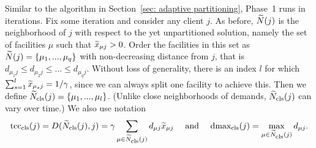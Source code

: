 \documentclass[oneside,final]{ucr}
\begin{document}
Similar to the algorithm in Section~\ref{sec: adaptive partitioning},
Phase~1 runs in iterations. Fix some iteration and consider any client
$j$.  As before, ${\widetilde N}(j)$ is the neighborhood of $j$ with respect
to the yet unpartitioned solution, namely the set of facilities $\mu$
such that ${\widetilde x}_{\mu j}>0$. Order the facilities in this set as
${\widetilde N}(j) = { \left\{ \mu_1,...,\mu_q \right\} }$ with non-decreasing distance
from $j$, that is $d_{\mu_1 j} \leq d_{\mu_2 j} \leq \ldots \leq
d_{\mu_q j}$. Without loss of generality,
there is an index $l$ for which $\sum_{s=1}^l {\widetilde x}_{\mu_s j} =
1/\gamma$, since we can always split one facility to achieve
this. Then we define ${\widetilde N}_{{\mbox{\scriptsize\rm cls}}}(j) = { \left\{ \mu_1,...,\mu_l \right\} }$. 
(Unlike close neighborhoods of demands, ${\widetilde N}_{{\mbox{\scriptsize\rm cls}}}(j)$ can vary over time.)
We also use notation
%
\begin{equation*}
\mbox{\rm{tcc}}_{{\mbox{\scriptsize\rm cls}}}(j) =  D({\widetilde N}_{{\mbox{\scriptsize\rm cls}}}(j), j) = \gamma\sum_{\mu\in{\widetilde N}_{{\mbox{\scriptsize\rm cls}}}(j)} d_{\mu j} {\widetilde x}_{\mu j}
			\quad\textrm{ and }\quad
 \mbox{\rm{dmax}}_{{\mbox{\scriptsize\rm cls}}}(j) = \max_{\mu \in {\widetilde N}_{{\mbox{\scriptsize\rm cls}}}(j)} d_{\mu j}. 
\end{equation*}
%
\end{document}

